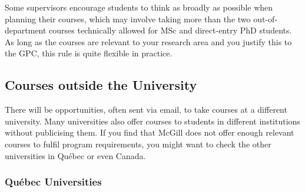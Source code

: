         Some supervisors encourage students to think as broadly as possible when planning their courses, which may involve taking more than the two out-of-department courses technically allowed for MSc and direct-entry PhD students. As long as the courses are relevant to your research area and you justify this to the GPC, this rule is quite flexible in practice. 

        \subsection{Courses outside the University}

There will be opportunities, often sent via email, to take courses at a different university. Many universities also offer courses to students in different institutions without publicising them. If you find that McGill does not offer enough relevant courses to fulfil program requirements, you might want to check the other universities in Québec or even Canada.

\subsubsection{Québec Universities}

